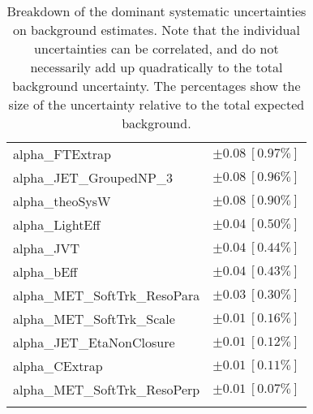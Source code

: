 \begin{table}
\begin{center}
\begin{tabular*}{\textwidth}{@{\extracolsep{\fill}}lc}
alpha\_FTExtrap         & $\pm 0.08\ [0.97\%] $       \\
alpha\_JET\_GroupedNP\_3         & $\pm 0.08\ [0.96\%] $       \\
alpha\_theoSysW         & $\pm 0.08\ [0.90\%] $       \\
alpha\_LightEff         & $\pm 0.04\ [0.50\%] $       \\
alpha\_JVT         & $\pm 0.04\ [0.44\%] $       \\
alpha\_bEff         & $\pm 0.04\ [0.43\%] $       \\
alpha\_MET\_SoftTrk\_ResoPara         & $\pm 0.03\ [0.30\%] $       \\
alpha\_MET\_SoftTrk\_Scale         & $\pm 0.01\ [0.16\%] $       \\
alpha\_JET\_EtaNonClosure         & $\pm 0.01\ [0.12\%] $       \\
alpha\_CExtrap         & $\pm 0.01\ [0.11\%] $       \\
alpha\_MET\_SoftTrk\_ResoPerp         & $\pm 0.01\ [0.07\%] $       \\
\noalign{\smallskip}\hline\noalign{\smallskip}
\end{tabular*}
\end{center}
\caption[Breakdown of uncertainty on background estimates]{
Breakdown of the dominant systematic uncertainties on background estimates.
Note that the individual uncertainties can be correlated, and do not necessarily add up quadratically to 
the total background uncertainty. The percentages show the size of the uncertainty relative to the total expected background.
\label{table.results.bkgestimate.uncertainties.SRA_TT}}
\end{table}
%